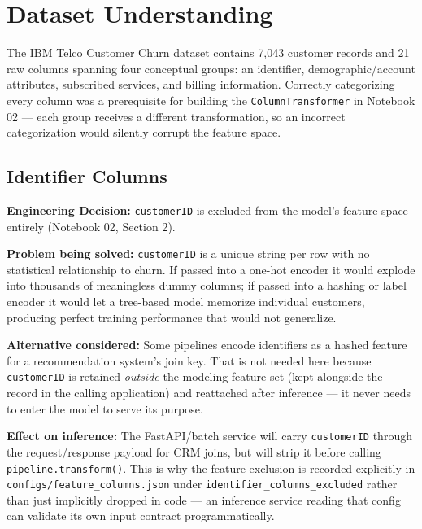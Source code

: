 \documentclass[11pt]{article}
\newcommand{\decision}[1]{%
\begin{decisionbox}
\textbf{\color{navy}Engineering Decision:} #1
\end{decisionbox}
}
\newcommand{\artifact}[1]{\texttt{\color{navy}#1}}
\begin{document}
\section{Dataset Understanding}

The IBM Telco Customer Churn dataset contains 7,043 customer records and 21 raw columns spanning four conceptual groups: an identifier, demographic/account attributes, subscribed services, and billing information. Correctly categorizing every column was a prerequisite for building the \texttt{ColumnTransformer} in Notebook 02 --- each group receives a different transformation, so an incorrect categorization would silently corrupt the feature space.

\subsection{Identifier Columns}

\decision{\artifact{customerID} is excluded from the model's feature space entirely (Notebook 02, Section 2).}

\textbf{Problem being solved:} \artifact{customerID} is a unique string per row with no statistical relationship to churn. If passed into a one-hot encoder it would explode into thousands of meaningless dummy columns; if passed into a hashing or label encoder it would let a tree-based model memorize individual customers, producing perfect training performance that would not generalize.

\textbf{Alternative considered:} Some pipelines encode identifiers as a hashed feature for a recommendation system's join key. That is not needed here because \artifact{customerID} is retained \emph{outside} the modeling feature set (kept alongside the record in the calling application) and reattached after inference --- it never needs to enter the model to serve its purpose.

\textbf{Effect on inference:} The FastAPI/batch service will carry \artifact{customerID} through the request/response payload for CRM joins, but will strip it before calling \texttt{pipeline.transform()}. This is why the feature exclusion is recorded explicitly in \artifact{configs/feature\_columns.json} under \texttt{identifier\_columns\_excluded} rather than just implicitly dropped in code --- an inference service reading that config can validate its own input contract programmatically.
\end{document}
